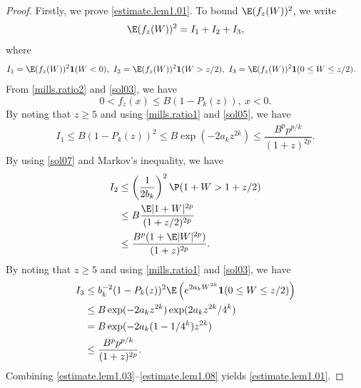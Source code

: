 	\begin{proof}
		Firstly, we prove \eqref{estimate.lem1.01}.
		To bound $\E(f_{z}(W))^2$, we write 
		\begin{equation}\label{estimate.lem1.03}
			\E (f_{z}(W))^2 =I_1+I_2+I_3,
		\end{equation}
		where
		\begin{equation*}
			\begin{split}
				I_1&=\E (f_{z}(W))^2\mathbf{1}(W< 0),\
				I_2=\E (f_{z}(W))^2\mathbf{1}(W>z/2),\
				I_3=\E (f_{z}(W))^2\mathbf{1}(0\le W\le z/2).
			\end{split}
		\end{equation*}
From  \eqref{mills.ratio2} and \eqref{sol03}, we have 
	\begin{equation}\label{sol05}
			0 < f_z(x) \le B(1-P_k(z)),\ x<0.
		\end{equation}
		By noting that $z\ge 5$ and using \eqref{mills.ratio1} and \eqref{sol05}, we have
		\begin{equation}\label{estimate.lem1.05}
			\begin{split}
				I_1\le B(1-P_k(z))^2 
				\le  B\exp \left(-2a_k z^{2 k}\right)
				\le \dfrac{B^pp^{p/k}}{(1+z)^{2p}}.
			\end{split} 
		\end{equation}
		By using \eqref{sol07} and Markov's inequality, we have
		\begin{equation}\label{estimate.lem1.07}
			\begin{split}
				I_2&\le \left(\frac{1}{2b_k}\right)^2 \P(1+W>1+z/2)\\
				&\le B \frac{\E|1+W|^{2p}}{(1+z/2)^{2p}}\\
				&\le \dfrac{B^p(1+\E|W|^{2p})}{(1+z)^{2p}}.
			\end{split} 
		\end{equation}
		By noting that $z\ge 5$ and using \eqref{mills.ratio1} and \eqref{sol03}, we have
		\begin{equation}\label{estimate.lem1.08}
			\begin{split}
				I_3		&\le b_k^{-2}(1-P_k(z))^2 \E \left(e^{2a_kW^{2k}} \mathbf{1}(0 \le W \le z/2)\right) \\
				&\le B\exp({-2a_kz^{2k}}) \exp({2a_kz^{2k}/4^k})\\
				&=B\exp({-2a_k(1-1/4^k)z^{2k}})\\
				&\le \dfrac{B^p p^{p/k}}{(1+z)^{2p}}.
			\end{split} 
		\end{equation}
		Combining \eqref{estimate.lem1.03}--\eqref{estimate.lem1.08} yields \eqref{estimate.lem1.01}.
		

\end{proof}
